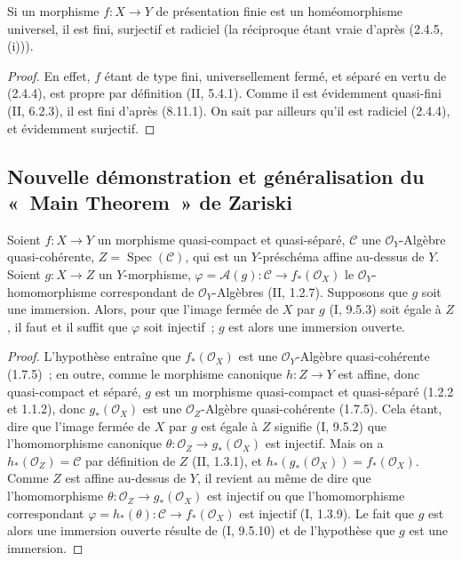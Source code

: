 \begin{proposition}[8.11.6]
\label{IV.8.11.6-fr}
Si un morphisme $f:X\to Y$ de présentation finie est un homéomorphisme
universel, il est fini, surjectif et radiciel (la réciproque étant vraie
d'après (2.4.5, (i))).
\end{proposition}

\begin{proof}
En effet, $f$ étant de type fini, universellement fermé, et séparé en vertu de
(2.4.4), est propre par définition (II, 5.4.1). Comme il est évidemment
quasi-fini (II, 6.2.3), il est fini d'après (8.11.1). On sait par ailleurs
qu'il est radiciel (2.4.4), et évidemment surjectif.
\end{proof}

\subsection{Nouvelle démonstration et généralisation du «~Main Theorem~» de Zariski}
\label{subsection:IV.8.12-fr}
\label{IV.8.12-fr}

\begin{lemma}[8.12.1]
\label{IV.8.12.1-fr}
Soient $f:X\to Y$ un morphisme quasi-compact et quasi-séparé, $\mathcal C$ une
$\mathcal O_Y$-Algèbre quasi-cohérente, $Z=\operatorname{Spec}(\mathcal C)$,
qui est un $Y$-préschéma affine au-dessus de $Y$. Soient $g:X\to Z$ un
$Y$-morphisme, $\varphi=\mathcal A(g):\mathcal C\to f_*(\mathcal O_X)$ le
$\mathcal O_Y$-homomorphisme correspondant de $\mathcal O_Y$-Algèbres
(II, 1.2.7). Supposons que $g$ soit une immersion. Alors, pour que l'image
fermée de $X$ par $g$ (I, 9.5.3) soit égale à $Z$, il faut et il suffit que
$\varphi$ soit injectif~; $g$ est alors une immersion ouverte.
\end{lemma}

\begin{proof}
L'hypothèse entraîne que $f_*(\mathcal O_X)$ est une $\mathcal O_Y$-Algèbre
quasi-cohérente (1.7.5)~; en outre, comme le morphisme canonique $h:Z\to Y$
est affine, donc quasi-compact et séparé, $g$ est un
morphisme quasi-compact et quasi-séparé (1.2.2 et 1.1.2), donc $g_*(\mathcal O_X)$ est une
$\mathcal O_Z$-Algèbre quasi-cohérente (1.7.5). Cela étant, dire que l'image
fermée de $X$ par $g$ est égale à $Z$ signifie (I, 9.5.2) que
l'homomorphisme canonique $\theta:\mathcal O_Z\to g_*(\mathcal O_X)$ est
injectif. Mais on a $h_*(\mathcal O_Z)=\mathcal C$ par définition de $Z$
(II, 1.3.1), et $h_*(g_*(\mathcal O_X))=f_*(\mathcal O_X)$. Comme $Z$ est
affine au-dessus de $Y$, il revient au même de dire que l'homomorphisme
$\theta:\mathcal O_Z\to g_*(\mathcal O_X)$ est injectif ou que
l'homomorphisme correspondant
$\varphi=h_*(\theta):\mathcal C\to f_*(\mathcal O_X)$ est injectif
(I, 1.3.9). Le fait que $g$ est alors une immersion ouverte résulte de
(I, 9.5.10) et de l'hypothèse que $g$ est une immersion.
\end{proof}

